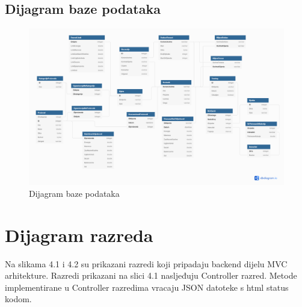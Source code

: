 			\subsection{Dijagram baze podataka}
				\begin{figure}[H]
					\includegraphics[width=\textwidth,height=\textheight,keepaspectratio]{dijagrami/dijagramBaze.png}
					\centering
					\caption{Dijagram baze podataka}
					\label{fig:promjene}
				\end{figure}
			
			\eject
			
			
		\section{Dijagram razreda}
		
			Na slikama 4.1 i 4.2 su prikazani razredi koji pripadaju backend dijelu MVC
			arhitekture. Razredi prikazani na slici 4.1 nasljeđuju Controller razred. Metode implementirane u Controller razredima vracaju JSON datoteke s html status kodom. 
			
